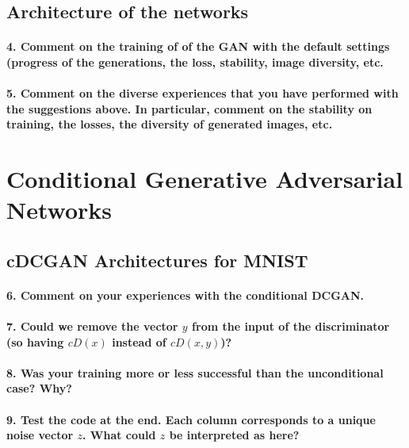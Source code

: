 \subsection{Architecture of the networks}

\paragraph*{4. Comment on the training of of the GAN with the default settings (progress of the generations, the loss, stability, image diversity, etc.}

\paragraph*{5. Comment on the diverse experiences that you have performed with the suggestions above. In particular, comment on the stability on training, the losses, the diversity of generated images, etc.}

\section{Conditional Generative Adversarial Networks}


\subsection{cDCGAN Architectures for MNIST}


\paragraph*{6. Comment on your experiences with the conditional DCGAN.}

\paragraph*{7. Could we remove the vector $y$ from the input of the discriminator (so having $cD(x)$ instead of $cD(x, y)$)?}


\paragraph*{8. Was your training more or less successful than the unconditional case? Why?}

\paragraph*{9. Test the code at the end. Each column corresponds to a unique noise vector $z$. What could $z$ be interpreted as here?}

